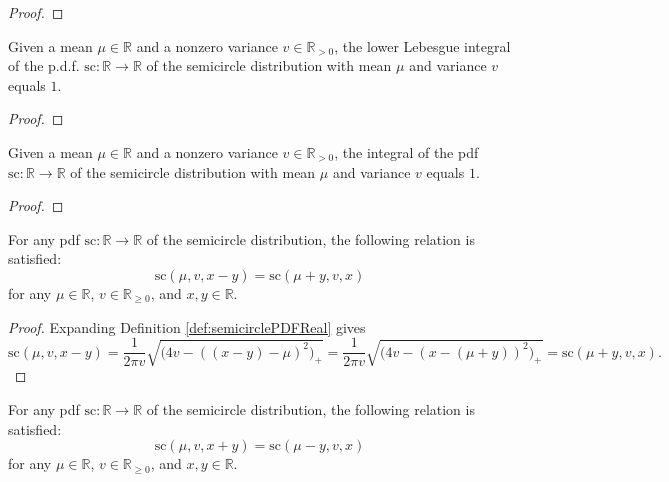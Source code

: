 \begin{proof}
  \leanok
\end{proof}
\begin{lemma}\label{lem:lintegral_semicirclePDFReal_eq_one}
    \leanok
    Given a mean $\mu \in \mathbb{R}$ and a nonzero variance $v \in \mathbb{R}_{> 0}$, the lower Lebesgue integral of the p.d.f. $\mathrm{sc} : \mathbb{R} \rightarrow \mathbb{R}$
    of the semicircle distribution with mean $\mu$ and variance $v$ equals $1$.
\end{lemma}
\begin{proof}
\end{proof}
\begin{lemma}\label{lem:integral_semicirclePDFReal_eq_one}
    \leanok
    Given a mean $\mu \in \mathbb{R}$ and a nonzero variance $v \in \mathbb{R}_{> 0}$, the integral of the pdf $\mathrm{sc} : \mathbb{R} \rightarrow \mathbb{R}$
    of the semicircle distribution with mean $\mu$ and variance $v$ equals $1$.
\end{lemma}
\begin{proof}
\end{proof}
\begin{lemma}\label{lem:semicirclePDFReal_sub}
    \leanok
    For any pdf $\mathrm{sc} : \mathbb{R} \rightarrow \mathbb{R}$
    of the semicircle distribution, the following relation is satisfied:
    \[
    \mathrm{sc}(\mu,v,x-y) = \mathrm{sc}(\mu+y,v,x)
    \]
    for any $\mu \in \mathbb{R}$, $v \in \mathbb{R}_{\geq 0}$, and $x,y \in \mathbb{R}$.
\end{lemma}
\begin{proof}
  \leanok
   Expanding Definition \ref{def:semicirclePDFReal} gives
   \[
   \mathrm{sc}(\mu,v,x-y)
   = \frac{1}{2πv} \sqrt{\bigl( 4v - ( (x - y) - μ)^2 \bigl)_+}
   = \frac{1}{2πv} \sqrt{\bigl( 4v - (x - (μ + y))^2 \bigl)_+}
   = \mathrm{sc}(\mu+y,v,x).
   \]
\end{proof}
\begin{lemma}\label{lem:semicirclePDFReal_add}
    \leanok
    For any pdf $\mathrm{sc} : \mathbb{R} \rightarrow \mathbb{R}$
    of the semicircle distribution, the following relation is satisfied:
    \[
    \mathrm{sc}(\mu,v,x+y) = \mathrm{sc}(\mu-y,v,x)
    \]
    for any $\mu \in \mathbb{R}$, $v \in \mathbb{R}_{\geq 0}$, and $x,y \in \mathbb{R}$.
\end{lemma}
